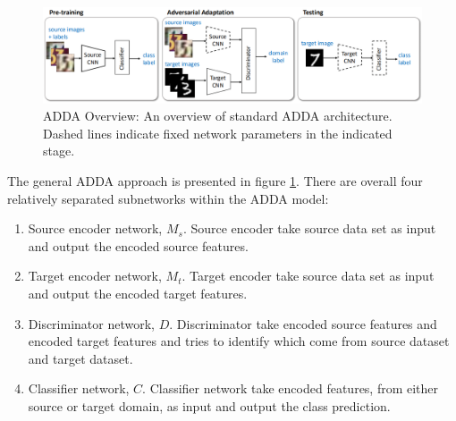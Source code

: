\documentclass[conference]{IEEEtran}
\begin{document}
\begin{figure}
  \centering
  \includegraphics[width=.75\textwidth]{LADDA_theorem1.jpg}
  \caption{ADDA Overview: An overview of standard ADDA architecture. Dashed lines indicate fixed network parameters in the indicated stage.}
  \label{ADDA_overview}
\end{figure}
The general ADDA approach is presented in figure \ref{ADDA_overview}. There are overall four relatively separated subnetworks within the ADDA model:
\begin{enumerate}
  \item Source encoder network, $M_s$. Source encoder take source data set as input and output the encoded source features.
  \item Target encoder network, $M_t$. Target encoder take source data set as input and output the encoded target features.
  \item Discriminator network, $D$. Discriminator take encoded source features and encoded target features and tries to identify which come from source dataset and target dataset.
  \item Classifier network, $C$. Classifier network take encoded features, from either source or target domain, as input and output the class prediction.
\end{enumerate}
\end{document}
